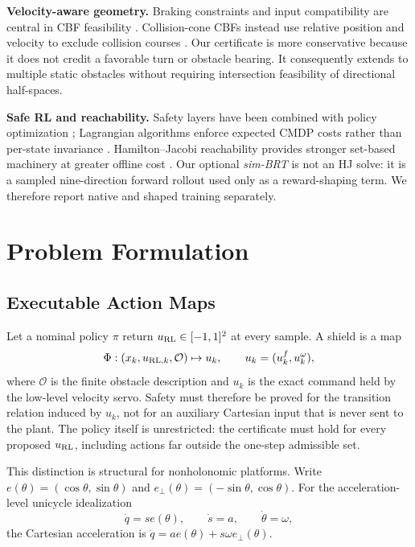 \documentclass[letterpaper]{article}
\begin{document}
\textbf{Velocity-aware geometry.}
Braking constraints and input compatibility are central in CBF feasibility
\cite{xiao2022feasibility,beaver2024}.  Collision-cone CBFs instead use
relative position and velocity to exclude collision courses
\cite{tayal2024}.  Our certificate is more conservative because it does not
credit a favorable turn or obstacle bearing.  It consequently extends to
multiple static obstacles without requiring intersection feasibility of
directional half-spaces.

\textbf{Safe RL and reachability.}
Safety layers have been combined with policy optimization
\cite{cheng2019,taylor2020}; Lagrangian algorithms enforce expected CMDP costs
rather than per-state invariance \cite{achiam2017,ray2019}.  Hamilton--Jacobi
reachability provides stronger set-based machinery at greater offline cost
\cite{mitchell2005,bansal2017,fisac2019}.  Our optional \emph{sim-BRT} is not
an HJ solve: it is a sampled nine-direction forward rollout used only as a
reward-shaping term.  We therefore report native and shaped training
separately.

\section{Problem Formulation}

\subsection{Executable Action Maps}

Let a nominal policy $\pi$ return $u_{\rm RL}\in[-1,1]^2$ at every sample.
A shield is a map
\begin{equation}
 \Phi:(x_k,u_{{\rm RL},k},\mathcal O)\mapsto u_k,
 \qquad u_k=(u_k^f,u_k^\omega),                       \label{eq:shieldmap}
\end{equation}
where $\mathcal O$ is the finite obstacle description and $u_k$ is the exact
command held by the low-level velocity servo.  Safety must therefore be proved
for the transition relation induced by $u_k$, not for an auxiliary Cartesian
input that is never sent to the plant.  The policy itself is unrestricted: the
certificate must hold for every proposed $u_{\rm RL}$, including actions far
outside the one-step admissible set.

This distinction is structural for nonholonomic platforms.  Write
$e(\theta)=(\cos\theta,\sin\theta)$ and
$e_\perp(\theta)=(-\sin\theta,\cos\theta)$.  For the acceleration-level
unicycle idealization
\begin{equation}
 \dot q=s e(\theta),\qquad \dot s=a,
 \qquad \dot\theta=\omega,                              \label{eq:unicycle}
\end{equation}
the Cartesian acceleration is
$\ddot q=a e(\theta)+s\omega e_\perp(\theta)$.
\end{document}
